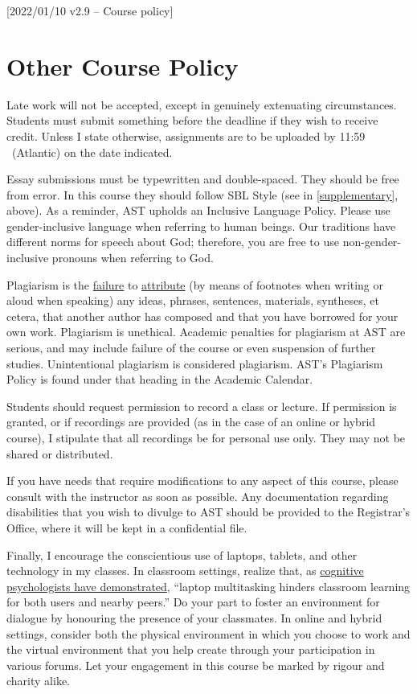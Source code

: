 [2022/01/10 v2.9 -- Course policy]

\section{Other Course Policy}
\label{policy}

Late work will not be accepted, except in genuinely extenuating
circumstances. Students must submit something before the deadline if
they wish to receive credit. Unless I state otherwise, assignments are
to be uploaded by 11:59 \PM\ (Atlantic) on the date indicated.

Essay submissions must be typewritten and double-spaced. They should be
free from error. In this course they should follow SBL Style (see
\cite{sbl2} in \autoref{supplementary}, above). As a reminder, AST
upholds an Inclusive Language Policy. Please use gender-inclusive
language when referring to human beings. Our traditions have different
norms for speech about God; therefore, you are free to use
non-gender-inclusive pronouns when referring to God.


Plagiarism is the
\href{http://www.eerdmans.com/Pages/Item/59043/Commentary-Statement.aspx}{failure}
to \href{https://www.theguardian.com/world/2013/feb/09/german-education-minister-quits-phd-plagiarism}{attribute}
(by means of footnotes when writing or aloud when speaking) any ideas,
phrases, sentences, materials, syntheses, et cetera, that another author
has composed and that you have borrowed for your own work. Plagiarism is
unethical. Academic penalties for plagiarism at AST are serious, and may
include failure of the course or even suspension of further studies.
Unintentional plagiarism is considered plagiarism. AST's Plagiarism
Policy is found under that heading in the Academic
Calendar.

Students should request permission to record a class or lecture. If
permission is granted, or if recordings are provided (as in the case of
an online or hybrid course), I stipulate that all recordings be for
personal use only. They may not be shared or distributed.

If you have needs that require modifications to any aspect of this
course, please consult with the instructor as soon as possible. Any
documentation regarding disabilities that you wish to divulge to AST
should be provided to the Registrar’s Office, where it will be kept in a
confidential file.

Finally, I encourage the conscientious use of laptops, tablets, and
other technology in my classes. In classroom settings, realize that, as
\href{http://dx.doi.org/10.1016/j.compedu.2012.10.003}{cognitive
psychologists have demonstrated}, ``laptop multitasking hinders
classroom learning for both users and nearby peers.'' Do your part to
foster an environment for dialogue by honouring the presence of your
classmates. In online and hybrid settings, consider both the physical
environment in which you choose to work and the virtual environment that
you help create through your participation in various forums. Let your
engagement in this course be marked by rigour and charity alike.
